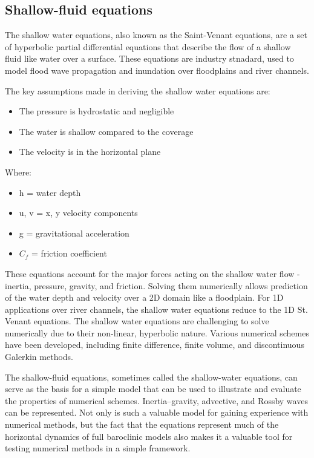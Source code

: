 \documentclass{article}
\begin{document}
\subsection{Shallow-fluid equations}

The shallow water equations, also known as the Saint-Venant equations, are a set of hyperbolic partial differential equations that describe the flow of a shallow fluid like water over a surface. These equations are industry stnadard,  used to model flood wave propagation and inundation over floodplains and river channels.

The key assumptions made in deriving the shallow water equations are:
\begin{itemize}
	\item The pressure is hydrostatic and negligible
	\item The water is shallow compared to the coverage
	\item The velocity is in the horizontal plane
\end{itemize}

Where:

\begin{itemize}
\item h = water depth
\item u, v = x, y velocity components
\item g = gravitational acceleration
\item $C_f$ = friction coefficient
\end{itemize}


These equations account for the major forces acting on the shallow water flow - inertia, pressure, gravity, and friction. Solving them numerically allows prediction of the water depth and velocity over a 2D domain like a floodplain.  For 1D applications over river channels, the shallow water equations reduce to the 1D St. Venant equations.  The shallow water equations are challenging to solve numerically due to their non-linear, hyperbolic nature. Various numerical schemes have been developed, including finite difference, finite volume, and discontinuous Galerkin methods.

The shallow-fluid equations, sometimes called the shallow-water equations, can serve as the basis for a simple model that can be used to illustrate and evaluate the properties of numerical schemes. Inertia--gravity, advective, and Rossby waves can be represented. Not only is such a valuable model for gaining experience with numerical methods, but the fact that the equations represent much of the horizontal dynamics of full baroclinic models also makes it a valuable tool for testing numerical methods in a simple framework.
\end{document}
